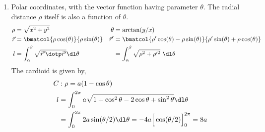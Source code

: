 \begin{enumerate}
    \item Polar coordinates, with the vector function having parameter $ \theta $.
          The radial distance $ \rho $ itself is also a function of $ \theta $.
          \begin{align}
              \rho       & = \sqrt{x^2 + y^2}                                     &
              \theta     & = \arctan(y/x)                                           \\
              \vec{r}    & = \bmatcol{\rho \cos(\theta)}{\rho \sin(\theta)}       &
              \vec{r}'   & = \bmatcol{\rho' \cos(\theta) - \rho \sin(\theta)}
              {\rho' \sin(\theta) + \rho \cos(\theta)}                              \\
              l          & = \int_{\alpha}^{\beta} \sqrt{\vec{r}' \dotp \vec{r}'}
              \dl \theta &
                         & = \int_{\alpha}^{\beta} \sqrt{\rho^2 + \rho'^2}
              \ \dl \theta
          \end{align}
          The cardioid is given by,
          \begin{align}
              C & :\rho = a(1 - \cos \theta)                                \\
              l & = \int_{0}^{2\pi} a\sqrt{1 + \cos^2 \theta - 2\cos \theta
              + \sin^2 \theta} \dl \theta                                   \\
                & = \int_{0}^{2\pi} 2a \sin(\theta/2) \dl \theta
              = -4a \Big[ \cos(\theta/2) \Big]_0^{2\pi} = 8a
          \end{align}

          \begin{figure}[H]
              \centering
          \end{figure}


\end{enumerate}
